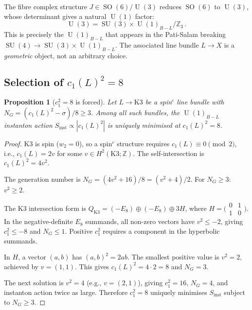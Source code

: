 \documentclass[12pt,a4paper]{article}
\newtheorem{proposition}[theorem]{Proposition}
\theoremstyle{definition}
\newcommand{\SO}{\operatorname{SO}}
\newcommand{\SU}{\operatorname{SU}}
\newcommand{\U}{\operatorname{U}}
\newcommand{\Z}{\mathbb{Z}}
\begin{document}
The fibre complex structure $J \in \SO(6)/\U(3)$ reduces $\SO(6)$ to $\U(3)$, whose determinant gives a natural $\U(1)$ factor:
\begin{equation}
\U(3) = \SU(3) \times \U(1)_{B-L} / \Z_3\,.
\end{equation}
This is precisely the $\U(1)_{B-L}$ that appears in the Pati-Salam breaking $\SU(4) \to \SU(3) \times \U(1)_{B-L}$.
The associated line bundle $L \to X$ is a \emph{geometric} object, not an arbitrary choice.

\subsection{Selection of \texorpdfstring{$c_1(L)^2 = 8$}{c1(L)² = 8}}
\label{sec:c1_selection}

\begin{proposition}[$c_1^2 = 8$ is forced]
\label{prop:c1_selection}
Let $L \to \mathrm{K3}$ be a spin$^c$ line bundle with $N_G = (c_1(L)^2 - \sigma)/8 \geq 3$.
Among all such bundles, the $\U(1)_{B-L}$ instanton action $S_{\mathrm{inst}} \propto |c_1(L)^2|$ is uniquely minimised at $c_1(L)^2 = 8$.
\end{proposition}

\begin{proof}
K3 is spin ($w_2 = 0$), so a spin$^c$ structure requires $c_1(L) \equiv 0 \pmod{2}$, i.e., $c_1(L) = 2v$ for some $v \in H^2(\mathrm{K3}; \Z)$.
The self-intersection is $c_1(L)^2 = 4 v^2$.

The generation number is $N_G = (4v^2 + 16)/8 = (v^2 + 4)/2$.
For $N_G \geq 3$: $v^2 \geq 2$.

The K3 intersection form is $Q_{\mathrm{K3}} = (-E_8) \oplus (-E_8) \oplus 3H$, where $H = \bigl(\begin{smallmatrix} 0 & 1 \\ 1 & 0 \end{smallmatrix}\bigr)$.
In the negative-definite $E_8$ summands, all non-zero vectors have $v^2 \leq -2$, giving $c_1^2 \leq -8$ and $N_G \leq 1$.
Positive $c_1^2$ requires a component in the hyperbolic summands.

In $H$, a vector $(a, b)$ has $(a,b)^2 = 2ab$.
The smallest positive value is $v^2 = 2$, achieved by $v = (1,1)$.
This gives $c_1(L)^2 = 4 \cdot 2 = 8$ and $N_G = 3$.

The next solution is $v^2 = 4$ (e.g., $v = (2,1)$), giving $c_1^2 = 16$, $N_G = 4$, and instanton action twice as large.
Therefore $c_1^2 = 8$ uniquely minimises $S_{\mathrm{inst}}$ subject to $N_G \geq 3$.
\end{proof}
\end{document}
